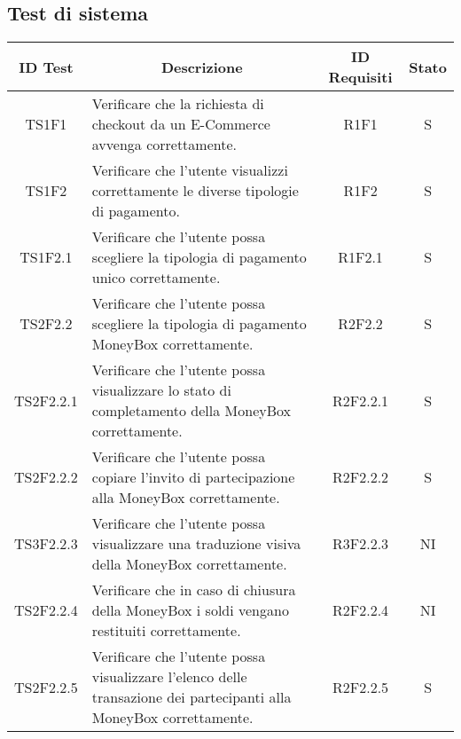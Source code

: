 \subsection{Test di sistema}\label{subsection:test_sistema}
\begin{table}[H]
  \centering
  \renewcommand{\arraystretch}{1.8}
  \begin{tabular}{c|p{8cm}|c|c}
    \rowcolor[HTML]{125E28}
    \color[HTML]{FFFFFF}\textbf{ID Test}
              & \multicolumn{1}{c}{\color[HTML]{FFFFFF}\textbf{Descrizione}}
              & \color[HTML]{FFFFFF}\textbf{ID Requisiti}
              & \color[HTML]{FFFFFF}\textbf{Stato}                                                                                                        \\
    \hline
    TS1F1     & Verificare che la richiesta di checkout da un E-Commerce\glo{} avvenga correttamente.                                     & R1F1     & S \\
    TS1F2     & Verificare che l'utente visualizzi correttamente le diverse tipologie di pagamento.                                       & R1F2     & S \\
    TS1F2.1   & Verificare che l'utente possa scegliere la tipologia di pagamento unico correttamente.                                    & R1F2.1   & S \\
    TS2F2.2   & Verificare che l'utente possa scegliere la tipologia di pagamento MoneyBox\glo{} correttamente.                           & R2F2.2   & S \\
    TS2F2.2.1 & Verificare che l'utente possa visualizzare lo stato di completamento della MoneyBox\glo{} correttamente.                  & R2F2.2.1 & S \\
    TS2F2.2.2 & Verificare che l'utente possa copiare l'invito di partecipazione alla MoneyBox\glo{} correttamente.                       & R2F2.2.2 & S \\
    TS3F2.2.3 & Verificare che l'utente possa visualizzare una traduzione visiva della MoneyBox\glo{} correttamente.                      & R3F2.2.3 & NI \\
    TS2F2.2.4 & Verificare che in caso di chiusura della MoneyBox\glo{} i soldi vengano restituiti correttamente.                         & R2F2.2.4 & NI \\
    TS2F2.2.5 & Verificare che l'utente possa visualizzare l'elenco delle transazione dei partecipanti alla MoneyBox\glo{} correttamente. & R2F2.2.5 & S \\
  \end{tabular}
\end{table}
